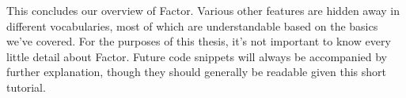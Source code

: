 
This concludes our overview of Factor.  Various other features are hidden away
in different vocabularies, most of which are understandable based on the basics
we've covered.  For the purposes of this thesis, it's not important to know
every little detail about Factor.  Future code snippets will always be
accompanied by further explanation, though they should generally be readable
given this short tutorial.
